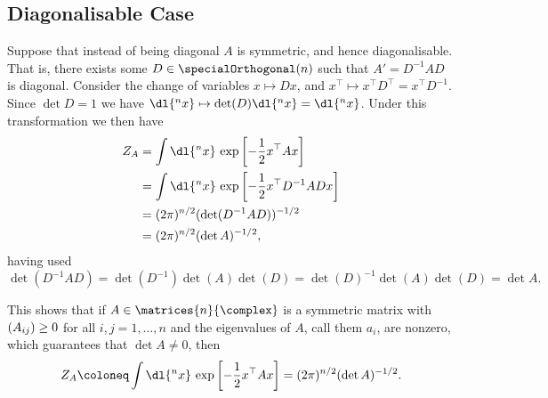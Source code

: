 \documentclass[fleqn]{NotesClass}
\let\Re\relax
\DeclareMathOperator{\Re}{Re}
\newcommand{\trans}{{\top}}
\begin{document}
    \subsection{Diagonalisable Case}
    Suppose that instead of being diagonal \(A\) is symmetric, and hence diagonalisable.
    That is, there exists some \(D \in \specialOrthogonal(n)\) such that \(A' = D^{-1}AD\) is diagonal.
    Consider the change of variables \(x \mapsto Dx\), and \(x^\trans \mapsto x^\trans D^\trans = x^{\trans}D^{-1}\).
    Since \(\det D = 1\) we have \(\dl{^nx} \mapsto \det(D) \dl{^nx} = \dl{^nx}\).
    Under this transformation we then have
    \begin{align}
        Z_A &= \int \dl{^nx} \, \exp\left[ -\frac{1}{2}x^\trans Ax \right]\\
        &= \int \dl{^nx} \, \exp\left[ -\frac{1}{2}x^\trans D^{-1}ADx \right]\\
        &= (2\pi)^{n/2}(\det(D^{-1}AD))^{-1/2}\\
        &= (2\pi)^{n/2} (\det A)^{-1/2},
    \end{align}
    having used
    \begin{equation*}
        \det(D^{-1}AD) = \det(D^{-1})\det(A)\det(D) = \det(D)^{-1}\det(A)\det(D) = \det A.
    \end{equation*}
    
    This shows that if \(A \in \matrices{n}{\complex}\) is a symmetric matrix with \(\Re(A_{ij}) \ge 0\) for all \(i, j = 1, \dotsc, n\) and the eigenvalues of \(A\), call them \(a_i\), are nonzero, which guarantees that \(\det A \ne 0\), then
    \begin{equation}
        Z_A \coloneq \int \dl{^nx} \, \exp\left[ -\frac{1}{2}x^\trans Ax \right] = (2\pi)^{n/2} (\det A)^{-1/2}.
    \end{equation}
    
\end{document}
